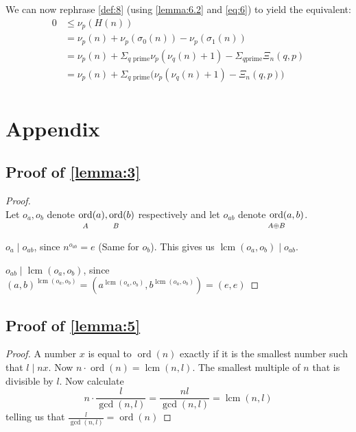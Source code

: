\documentclass{article}
\newcommand{\ordgroup}[1]{\ord_{\rule{0pt}{9pt}\mathclap{#1}}}
\DeclareMathOperator{\ordb}{ord}
\newcommand{\ord}{\mathop{\ordb}\limits}
\DeclareMathOperator{\lcm}{lcm}
\newenvironment{pg}{

}{

\medskip

}
\begin{document}
	We can now rephrase \cref{def:8} (using \cref{lemma:6.2} and \cref{eq:6}) to yield the equivalent:
	\begin{equation}
		\begin{split}
			0 &≤ ν_p(H(n)) \\
			&= ν_p(n) + ν_p(σ_0(n)) - ν_p(σ_1(n)) \\
			&= ν_p(n) + Σ_{q \text{ prime}} ν_p(ν_q(n) + 1) - Σ_{q \text{prime}} Ξ_n(q,p) \\
			&= ν_p(n) + Σ_{q \text{ prime}} \Big(ν_p(ν_q(n)+1) - Ξ_n(q,p)\Big) \\
		\end{split}
	\end{equation}

	
	\section{Appendix}\label{sec:appendix}
	
	\subsection{\texorpdfstring{Proof of \cref{lemma:3}}{Proof of Lemma 3}}\label{sec:proveLemmaThree}
	
	\usebox{\proveLemmaThree}
	
	\begin{proof} \rule{0pt}{0pt}\\
		Let $o_a, o_b$ denote $\ordgroup{A}(a), \ordgroup{B}(b)$ respectively and let $o_{ab}$ denote $\ordgroup{A \oplus B}(a,b)$.
		\begin{pg}
			$o_a \mid o_{ab}$, since $n^{o_{ab}} = e$ (Same for $o_b$). This gives us $\lcm(o_a, o_b) \mid o_{ab}$.
		\end{pg}
		\begin{pg}
			$o_{ab} \mid \lcm(o_a, o_b)$, since $(a,b)^{\lcm(o_a, o_b)} = (a^{\lcm(o_a, o_b)}, b^{\lcm(o_a, o_b)}) = (e,e)$
		\end{pg}
	\end{proof}
	
	\subsection{\texorpdfstring{Proof of \cref{lemma:5}}{Proof of Lemma 5}}\label{sec:proveLemmaFive}
	
	\usebox{\proveLemmaFive}
	
	\begin{proof}
		A number $x$ is equal to $\ord(n)$ exactly if it is the smallest number such that $l \mid nx$. Now $n · \ord(n) = \lcm(n, l)$. The smallest multiple of $n$ that is divisible by $l$.
		Now calculate
		\begin{equation*}
			n · \frac{l}{\gcd(n,l)} = \frac{nl}{\gcd(n,l)} = \lcm(n,l)
		\end{equation*}
		telling us that $\frac{l}{\gcd(n,l)} = \ord(n)$
	\end{proof}
	
	\printbibliography
\end{document}
